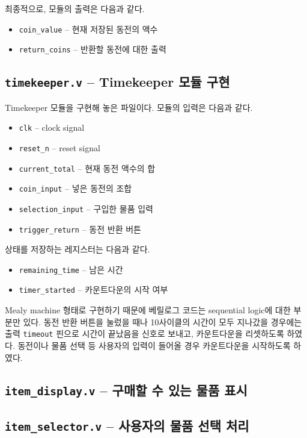 \documentclass{scrartcl}
\begin{document}
최종적으로, 모듈의 출력은 다음과 같다.

\begin{itemize}
  \item \texttt{coin\_value} -- 현재 저장된 동전의 액수
  \item \texttt{return\_coins} -- 반환할 동전에 대한 출력
\end{itemize}

\subsection{\texttt{timekeeper.v} -- Timekeeper 모듈 구현}
Timekeeper 모듈을 구현해 놓은 파일이다. 모듈의 입력은 다음과 같다.

\begin{itemize}
  \item \texttt{clk} -- clock signal
  \item \texttt{reset\_n} -- reset signal
  \item \texttt{current\_total} -- 현재 동전 액수의 합
  \item \texttt{coin\_input} -- 넣은 동전의 조합
  \item \texttt{selection\_input} -- 구입한 물품 입력
  \item \texttt{trigger\_return} -- 동전 반환 버튼
\end{itemize}

상태를 저장하는 레지스터는 다음과 같다.

\begin{itemize}
  \item \texttt{remaining\_time} -- 남은 시간
  \item \texttt{timer\_started} -- 카운트다운의 시작 여부
\end{itemize}

Mealy machine 형태로 구현하기 때문에 베릴로그 코드는 sequential logic에 대한 부분만 있다. 동전 반환 버튼을 눌렀을
때나 10사이클의 시간이 모두 지나갔을 경우에는 출력 \texttt{timeout} 핀으로 시간이 끝났음을 신호로 보내고, 카운트다운을
리셋하도록 하였다. 동전이나 물품 선택 등 사용자의 입력이 들어올 경우 카운트다운을 시작하도록 하였다.

\subsection{\texttt{item\_display.v} -- 구매할 수 있는 물품 표시}

\subsection{\texttt{item\_selector.v} -- 사용자의 물품 선택 처리}
\end{document}
